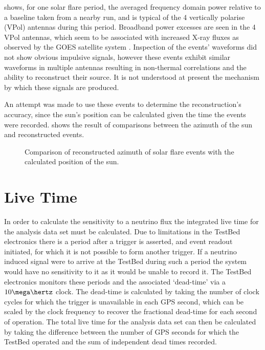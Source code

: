  shows, for one solar flare period, the averaged frequency domain power relative to a baseline taken from a nearby run, and is typical of the 4 vertically polarise (VPol) antennas during this period. Broadband power excesses are seen in the 4 VPol antennas, which seem to be associated with increased X-ray fluxes as observed by the GOES satellite system \cite{2009SPIE.7438E...1C}. Inspection of the events' waveforms did not show obvious impulsive signals, however these events exhibit similar waveforms in multiple antennas resulting in non-thermal correlations and the ability to reconstruct their source. It is not understood at present the mechanism by which these signals are produced.

An attempt was made to use these events to determine the reconstruction's accuracy, since the sun's position can be calculated given the time the events were recorded.  shows the result of comparisons between the azimuth of the sun and reconstructed events. 

\begin{figure}
  \hfill
  \caption{Comparison of reconstructed azimuth of solar flare events with the calculated position of the sun.}
  \label{fig:Results:Solar-Flare:Phi}
\end{figure}

\section{Live Time}
\label{sec:Results:Live-Time}

In order to calculate the sensitivity to a neutrino flux the integrated live time for the analysis data set must be calculated. Due to limitations in the TestBed electronics there is a period after a trigger is asserted, and event readout initiated, for which it is not possible to form another trigger. If a neutrino induced signal were to arrive at the TestBed during such a period the system would have no sensitivity to it as it would be unable to record it. The TestBed electronics monitors these periods and the associated `dead-time' via a $10 \mega \hertz$ clock. The dead-time is calculated by taking the number of clock cycles for which the trigger is unavailable in each GPS second, which can be scaled by the clock frequency to recover the fractional dead-time for each second of operation. The total live time for the analysis data set can then be calculated by taking the difference between the number of GPS seconds for which the TestBed operated and the sum of independent dead times recorded. 

